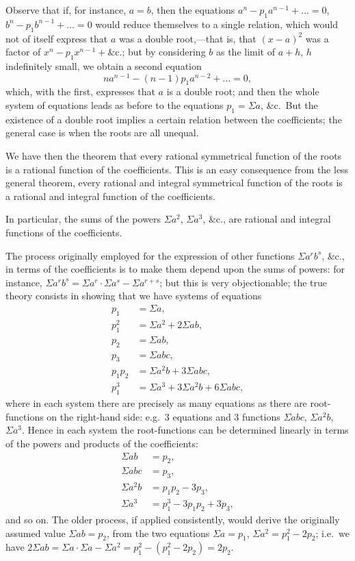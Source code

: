 \documentclass[11pt,a4paper]{article}
\begin{document}
Observe that if, for instance, $a = b$, then the equations $a^{n} - p_{1}a^{n-1} + \ldots = 0$, $b^{n} - p_{1}b^{n-1} + \ldots = 0$ would reduce themselves to a single relation, which would not of itself express that $a$ was a double root,---that is, that $(x - a)^{2}$ was a factor of $x^{n} - p_{1}x^{n-1} + \&$c.; but by considering $b$ as the limit of $a + h$, $h$ indefinitely small, we obtain a second equation
\[
na^{n-1} - (n - 1)p_{1}a^{n-2} + \ldots = 0,
\]
which, with the first, expresses that $a$ is a double root; and then the whole system of equations leads as before to the equations $p_{1} = \Sigma a$, \&c.\ But the existence of a double root implies a certain relation between the coefficients; the general case is when the roots are all unequal.

We have then the theorem that every rational symmetrical function of the roots is a rational function of the coefficients. This is an easy consequence from the less general theorem, every rational and integral symmetrical function of the roots is a rational and integral function of the coefficients.

In particular, the sums of the powers $\Sigma a^{2}$, $\Sigma a^{3}$, \&c., are rational and integral functions of the coefficients.

The process originally employed for the expression of other functions $\Sigma a^{r}b^{s}$, \&c., in terms of the coefficients is to make them depend upon the sums of powers: for instance, $\Sigma a^{r}b^{s} = \Sigma a^{r} \cdot \Sigma a^{s} - \Sigma a^{r+s}$; but this is very objectionable; the true theory consists in showing that we have systems of equations
\begin{align*}
p_{1} &= \Sigma a, \\
p_{1}^{2} &= \Sigma a^{2} + 2\Sigma ab, \\
p_{2} &= \Sigma ab, \\
p_{3} &= \Sigma abc, \\
p_{1}p_{2} &= \Sigma a^{2}b + 3\Sigma abc, \\
p_{1}^{3} &= \Sigma a^{3} + 3\Sigma a^{2}b + 6\Sigma abc,
\end{align*}
where in each system there are precisely as many equations as there are root-functions on the right-hand side: e.g.\ 3 equations and 3 functions $\Sigma abc$, $\Sigma a^{2}b$, $\Sigma a^{3}$. Hence in each system the root-functions can be determined linearly in terms of the powers and products of the coefficients:
\begin{align*}
\Sigma ab &= p_{2}, \\
\Sigma abc &= p_{3}, \\
\Sigma a^{2}b &= p_{1}p_{2} - 3p_{3}, \\
\Sigma a^{3} &= p_{1}^{3} - 3p_{1}p_{2} + 3p_{3},
\end{align*}
and so on. The older process, if applied consistently, would derive the originally assumed value $\Sigma ab = p_{2}$, from the two equations $\Sigma a = p_{1}$, $\Sigma a^{2} = p_{1}^{2} - 2p_{2}$; i.e.\ we have $2\Sigma ab = \Sigma a \cdot \Sigma a - \Sigma a^{2} = p_{1}^{2} - (p_{1}^{2} - 2p_{2}) = 2p_{2}$.
\end{document}
